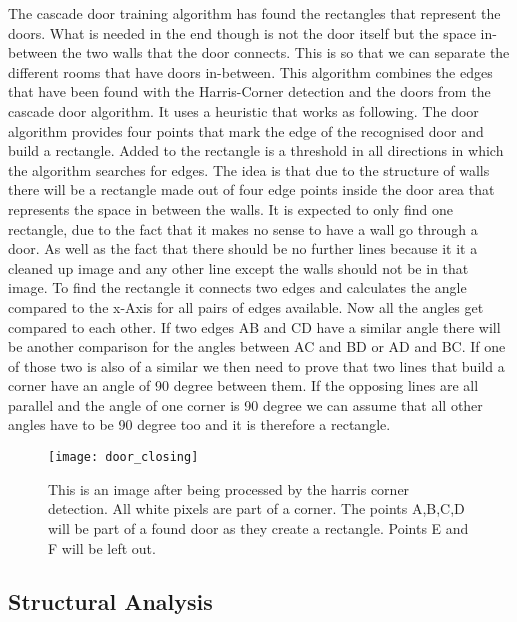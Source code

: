 The cascade door training algorithm has found the rectangles that represent the doors. What is needed in the end though is not the door itself but the space in-between the two walls that the door connects. This is so that we can separate the different rooms that have doors in-between.
This algorithm combines the edges that have been found with the Harris-Corner detection and the doors from the cascade door algorithm. It uses a heuristic that works as following. The door algorithm provides four points that mark the edge of the recognised door and build a rectangle.
Added to the rectangle is  a threshold in all directions in which the algorithm searches for edges. The idea is that due to the structure of walls there will be a rectangle made out of four edge points inside the door area that represents the space in between the walls. It is expected to only find one rectangle, due to the fact that it makes no sense to have a wall go through a door. As well as the fact that there should be no further lines because it it a cleaned up image and any other line except the walls should not be in that image.
To find the rectangle it connects two edges and calculates the angle compared to the x-Axis for all pairs of edges available. Now all the angles get compared to each other. If two edges AB and CD have a similar angle there will be another comparison for the angles between AC and BD or AD and BC. If one of those two is also of a similar we then need to prove that two lines that build a corner have an angle of 90 degree between them. If the opposing lines are all parallel and the angle of one corner is 90 degree we can assume that all other angles have to be 90 degree too and it is therefore a rectangle. 

\begin{figure}[h]
	\centering
	\texttt{[image: door\_closing]}
	\caption{This is an image after being processed by the harris corner detection. All white pixels are part of a corner. The points A,B,C,D will be part of a found door as they create a rectangle. Points E and F will be left out.}
	\label{fig:door_closing}
\end{figure}


\subsection{Structural Analysis}

